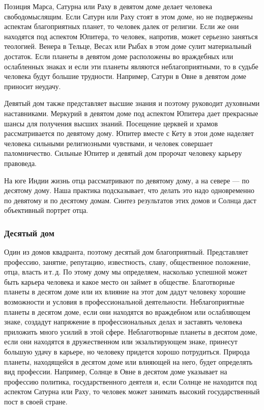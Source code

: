 Позиция Марса, Сатурна или Раху в девятом доме делает человека свободомыслящим. Если Сатурн или Раху стоят в этом доме, но не подвержены аспектам благоприятных планет, то человек далек от религии. Если же они находятся под аспектом Юпитера, то человек, напротив, может серьезно заняться теологией. Венера в Тельце, Весах или Рыбах в этом доме сулит материальный достаток. Если планеты в девятом доме расположены во враждебных или ослабленных знаках и если эти планеты являются неблагоприятными, то в судьбе человека будут большие трудности. Например, Сатурн в Овне в девятом доме приносит неудачу.

Девятый дом также представляет высшие знания и поэтому руководит духовными наставниками. Меркурий в девятом доме под аспектом Юпитера дает прекрасные шансы для получения высших знаний. Посещение церквей и храмов рассматривается по девятому дому. Юпитер вместе с Кету в этои доме наделяет человека сильными религиозными чувствами, и человек совершает паломничество. Сильные Юпитер и девятый дом пророчат человеку карьеру правоведа.

На юге Индии жизнь отца рассматривают по девятому дому, а на севере --- по десятому дому. Наша практика подсказывает, что делать это надо одновременно по девятому и по десятому домам. Синтез результатов этих домов и Солнца даст объективный портрет отца.

\subsubsection*{Десятый дом}

Один из домов квадранта, поэтому десятый дом благоприятный. Представляет профессию, занятие, репутацию, известность, славу, общественное положение, отца, власть и\,т.\,д. По этому дому мы определяем, насколько успешной может быть карьера человека и какое место он займет в обществе. Благотворные планеты в десятом доме или их влияние на этот дом дадут человеку хорошие возможности и условия в профессиональной деятельности. Неблагоприятные планеты в десятом доме, если они находятся во враждебном или ослабляющем знаке, создадут напряжение в профессиональных делах и заставять человека приложить много усилий в этой сфере. Неблаготворные планеты в десятом доме, если они находятся в дружественном или экзальтирующем знаке, принесут большую удачу в карьере, но человеку придется хорошо потрудиться. Природа планеты, находящейся в десятом доме или влияющей на него, будет определять вид профессии. Например, Солнце в Овне в десятом доме указывает на профессию политика, государственного деятеля и, если Солнце не находится под аспектом Сатурна или Раху, то человек может занимать высокий государственный пост в своей стране.

